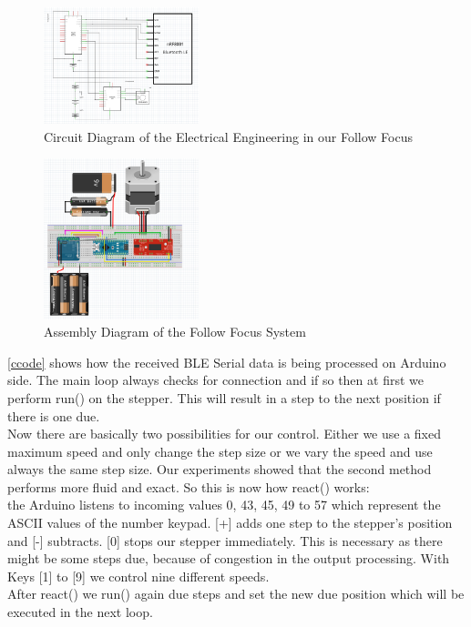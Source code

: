\documentclass{sigchi}
\begin{document}
\begin{figure}
\includegraphics[width=0.4\textwidth]{circuit.png}
\caption{Circuit Diagram of the Electrical Engineering in our Follow Focus}
\label{fig:Circuit}
\end{figure}
\begin{figure}
\includegraphics[width=0.4\textwidth]{assembly.png}
\caption{Assembly Diagram of the Follow Focus System}
\label{fig:Assembly}
\end{figure}
	
\autoref{ccode} shows how the received BLE Serial data is being processed on Arduino side. The main loop always checks for connection and if so then at first we perform run() on the stepper. This will result in a step to the next position if there is one due. \\
Now there are basically two possibilities for our control. Either we use a fixed maximum speed and only change the step size or we vary the speed and use always the same step size. Our experiments showed that the second method performs more fluid and exact. So this is now how react() works: \\
the Arduino listens to incoming values 0, 43, 45, 49 to 57 which represent the ASCII values of the number keypad. [+] adds one step to the stepper's position and [-] subtracts. [0] stops our stepper immediately. This is necessary as there might be some steps due, because of congestion in the output processing. With Keys [1] to [9] we control nine different speeds.\\
 After react() we run() again due steps and set the new due position which will be executed in the next loop.

 
\end{document}
